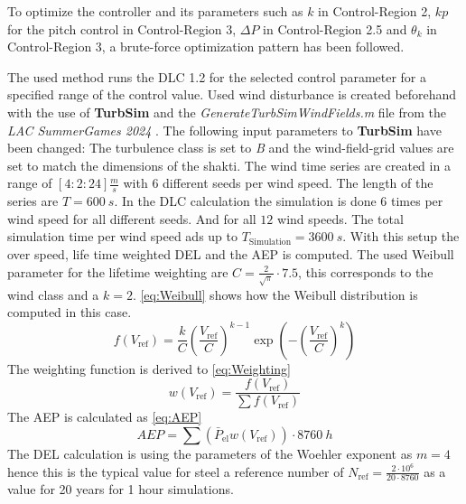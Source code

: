 To optimize the controller and its parameters such as $k$ in Control-Region 2, $kp$ for the pitch control in Control-Region 3, $\Delta P$ in  Control-Region 2.5 and $\theta_k$ in Control-Region 3, a brute-force optimization pattern has been followed.

The used method runs the \gls{DLC} 1.2 for the selected control parameter for a specified range of the control value. 
Used wind disturbance is created beforehand with the use of \textbf{TurbSim} and the \textit{GenerateTurbSimWindFields.m} file from the \textit{LAC SummerGames 2024} \cite{SummerGames}. 
The following input parameters to \textbf{TurbSim} have been changed: The turbulence class is set to \textit{B} and the wind-field-grid values are set to match the dimensions of the \gls{shakti}. 
The wind time series are created in a range of $[4:2:24]\frac{m}{s}$ with $6$ different seeds per wind speed. 
The length of the series are $T = \SI{600}{s}$. 
In the \gls{DLC} calculation the simulation is done $6$ times per wind speed for all different seeds. And for all $12$ wind speeds. The total simulation time per wind speed ads up to $T_{\text{Simulation}} = \SI{3600}{s}$. 
With this setup the over speed, life time weighted \gls{DEL} and the \gls{AEP} is computed. 
The used Weibull parameter for the lifetime weighting are $C = \frac{2}{\sqrt{\pi}}\cdot7.5$, this corresponds to the wind class \MakeUppercase{} \cite{IEC61400-1} and a $k = 2$. 
\ref{eq:Weibull} shows how the Weibull distribution is computed in this case.
\begin{equation}
	f(V_{\text{ref}}) = \frac{k}{C}\left(\frac{V_{\text{ref}}}{C}\right)^{k-1} \exp\left(-\left(\frac{V_{\text{ref}}}{C}\right)^k\right)
	\label{eq:Weibull}
\end{equation}
The weighting function is derived to \ref{eq:Weighting}
\begin{equation}
	w(V_{\text{ref}}) = \frac{f(V_{\text{ref}})}{\sum f(V_{\text{ref}})}
	\label{eq:Weighting}
\end{equation}
The \gls{AEP} is calculated as \ref{eq:AEP}
\begin{equation}
	AEP = \sum \left(\bar{P}_{\text{el}}w(V_{\text{ref}})\right)\cdot \SI{8760}{h}
	\label{eq:AEP}
\end{equation}
The DEL calculation is using the parameters of the Woehler exponent as $m = 4$ hence this is the typical value for steel a reference number of $N_{\text{ref}} = \frac{2\cdot10^6}{20\cdot8760}$ as a value for 20 years for 1 hour simulations.
